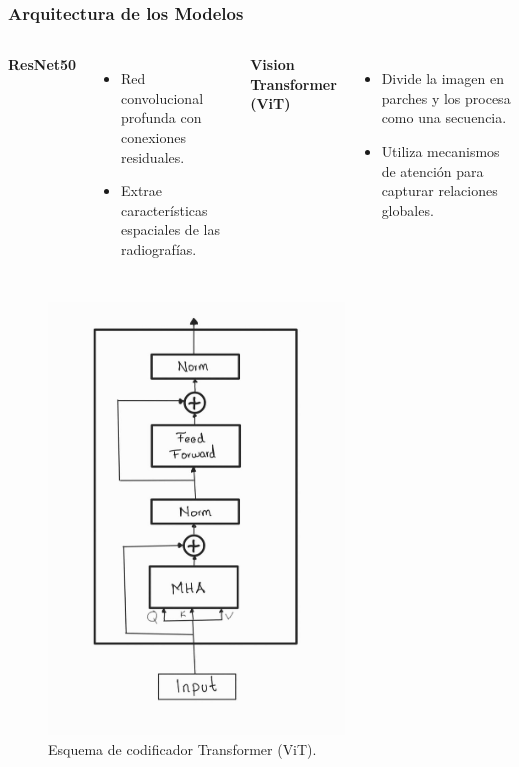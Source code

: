 \begin{frame}
\frametitle{Arquitectura de los Modelos}
\begin{columns}
\textbf{ResNet50}
\begin{itemize}
    \item Red convolucional profunda con conexiones residuales.
    \item Extrae características espaciales de las radiografías.
\end{itemize}
\textbf{Vision Transformer (ViT)}
\begin{itemize}
    \item Divide la imagen en parches y los procesa como una secuencia.
    \item Utiliza mecanismos de atención para capturar relaciones globales.
\end{itemize}
\end{columns}
\begin{figure}[ht!]
    \centering
    \includegraphics[width=0.7\textwidth]{../Chapters/2. Transformer/Figures/transformer/encoder.jpg}
    \caption{Esquema de codificador Transformer (ViT).}
\end{figure}
\end{frame}

